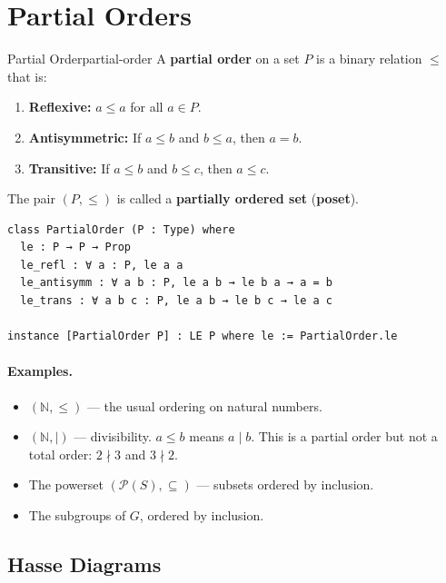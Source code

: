 \documentclass[11pt, a4paper, oneside]{book}
\newcommand{\N}{\mathbb{N}}
\begin{document}
\section{Partial Orders}

\begin{defn}{Partial Order}{partial-order}
A \textbf{partial order} on a set $P$ is a binary relation $\leq$ that is:
\begin{enumerate}[nosep, label=(\roman*)]
\item \textbf{Reflexive:} $a \leq a$ for all $a \in P$.
\item \textbf{Antisymmetric:} If $a \leq b$ and $b \leq a$, then $a = b$.
\item \textbf{Transitive:} If $a \leq b$ and $b \leq c$, then $a \leq c$.
\end{enumerate}
The pair $(P, \leq)$ is called a \textbf{partially ordered set} (\textbf{poset}).
\end{defn}

\begin{leanbox}
\begin{verbatim}
class PartialOrder (P : Type) where
  le : P → P → Prop
  le_refl : ∀ a : P, le a a
  le_antisymm : ∀ a b : P, le a b → le b a → a = b
  le_trans : ∀ a b c : P, le a b → le b c → le a c

instance [PartialOrder P] : LE P where le := PartialOrder.le
\end{verbatim}
\end{leanbox}

\paragraph{Examples.}
\begin{itemize}[nosep]
\item $(\N, \leq)$ --- the usual ordering on natural numbers.
\item $(\N, \mid)$ --- divisibility. $a \leq b$ means $a \mid b$.
      This is a partial order but not a total order: $2 \nmid 3$ and
      $3 \nmid 2$.
\item The powerset $(\mathcal{P}(S), \subseteq)$ --- subsets ordered by inclusion.
\item The subgroups of $G$, ordered by inclusion.
\end{itemize}

\subsection{Hasse Diagrams}
\end{document}
